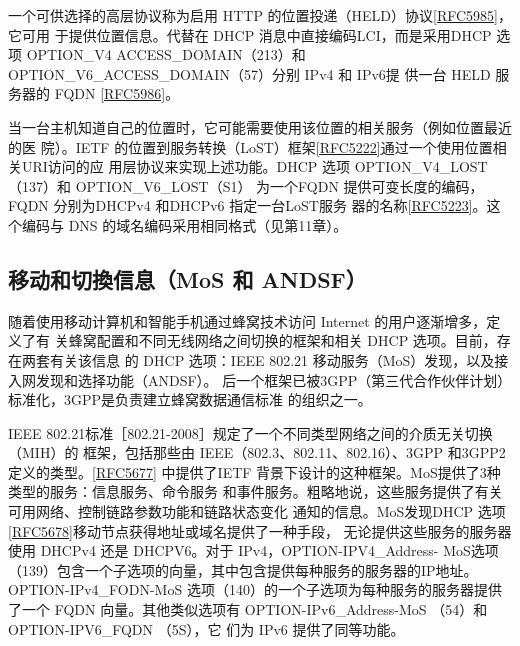 一个可供选择的高层协议称为启用 HTTP 的位置投递（HELD）协议\href{https://www.rfc-editor.org/rfc/rfc5985}{\href{https://www.rfc-editor.org/rfc/rfc5985}{[RFC5985]}}，它可用
于提供位置信息。代替在 DHCP 消息中直接编码LCI，而是采用DHCP 选项 OPTION\_V4
ACCESS\_DOMAIN（213）和 OPTION\_V6\_ACCESS\_DOMAIN（57）分别 IPv4 和 IPv6提
供一台 HELD 服务器的 FQDN \href{https://www.rfc-editor.org/rfc/rfc5986}{\href{https://www.rfc-editor.org/rfc/rfc5986}{[RFC5986]}}。

当一台主机知道自己的位置时，它可能需要使用该位置的相关服务（例如位置最近的医
院）。IETF 的位置到服务转换（LoST）框架\href{https://www.rfc-editor.org/rfc/rfc5222}{\href{https://www.rfc-editor.org/rfc/rfc5222}{[RFC5222]}}通过一个使用位置相关URI访问的应
用层协议来实现上述功能。DHCP 选项 OPTION\_V4\_LOST （137）和 OPTION\_V6\_LOST（S1）
为一个FQDN 提供可变长度的编码，FQDN 分别为DHCPv4 和DHCPv6 指定一台LoST服务
器的名称\href{https://www.rfc-editor.org/rfc/rfc5223}{\href{https://www.rfc-editor.org/rfc/rfc5223}{[RFC5223]}}。这个编码与 DNS 的域名编码采用相同格式（见第11章）。

\subsection{移动和切換信息（MoS 和 ANDSF）}
随着使用移动计算机和智能手机通过蜂窝技术访问 Internet 的用户逐渐增多，定义了有
关蜂窝配置和不同无线网络之间切换的框架和相关 DHCP 选项。目前，存在两套有关该信息
的 DHCP 选项：IEEE 802.21 移动服务（MoS）发现，以及接入网发现和选择功能（ANDSF）。
后一个框架已被3GPP（第三代合作伙伴计划）标准化，3GPP是负责建立蜂窝数据通信标准
的组织之一。

IEEE 802.21标准［802.21-2008］规定了一个不同类型网络之间的介质无关切换（MIH）的
框架，包括那些由 IEEE（802.3、802.11、802.16）、3GPP 和3GPP2定义的类型。\href{https://www.rfc-editor.org/rfc/rfc5677}{\href{https://www.rfc-editor.org/rfc/rfc5677}{[RFC5677]}}
中提供了IETF 背景下设计的这种框架。MoS提供了3种类型的服务：信息服务、命令服务
和事件服务。粗略地说，这些服务提供了有关可用网络、控制链路参数功能和链路状态变化
通知的信息。MoS发现DHCP 选项\href{https://www.rfc-editor.org/rfc/rfc5678}{\href{https://www.rfc-editor.org/rfc/rfc5678}{[RFC5678]}}移动节点获得地址或域名提供了一种手段，
无论提供这些服务的服务器使用 DHCPv4 还是 DHCPV6。对于 IPv4，OPTION-IPV4\_Address-
MoS选项（139）包含一个子选项的向量，其中包含提供每种服务的服务器的IP地址。
OPTION-IPv4\_FODN-MoS 选项（140）的一个子选项为每种服务的服务器提供了一个 FQDN
向量。其他类似选项有 OPTION-IPv6\_Address-MoS （54）和 OPTION-IPV6\_FQDN （5S），它
们为 IPv6 提供了同等功能。


